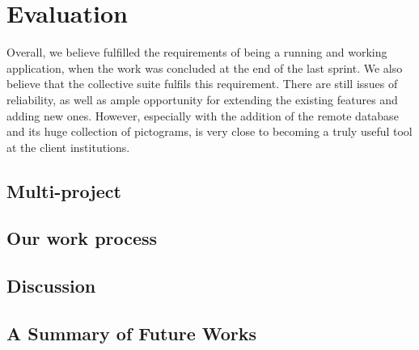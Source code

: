 \chapter{Evaluation}\label{chap:evaluation}

Overall, we believe \launcher fulfilled the requirements of being a running and working application, when the work was concluded at the end of the last sprint.
We also believe that the collective \giraf suite fulfils this requirement.
There are still issues of reliability, as well as ample opportunity for extending the existing features and adding new ones.
However, especially with the addition of the remote database and its huge collection of pictograms, \giraf is very close to becoming a truly useful tool at the client institutions. 

\section{Multi-project}\label{sec:eval:multiproject}


\section{Our work process}\label{sec:eval:us}


\section{Discussion}\label{sec:eval:discussion}


\section{A Summary of Future Works}
